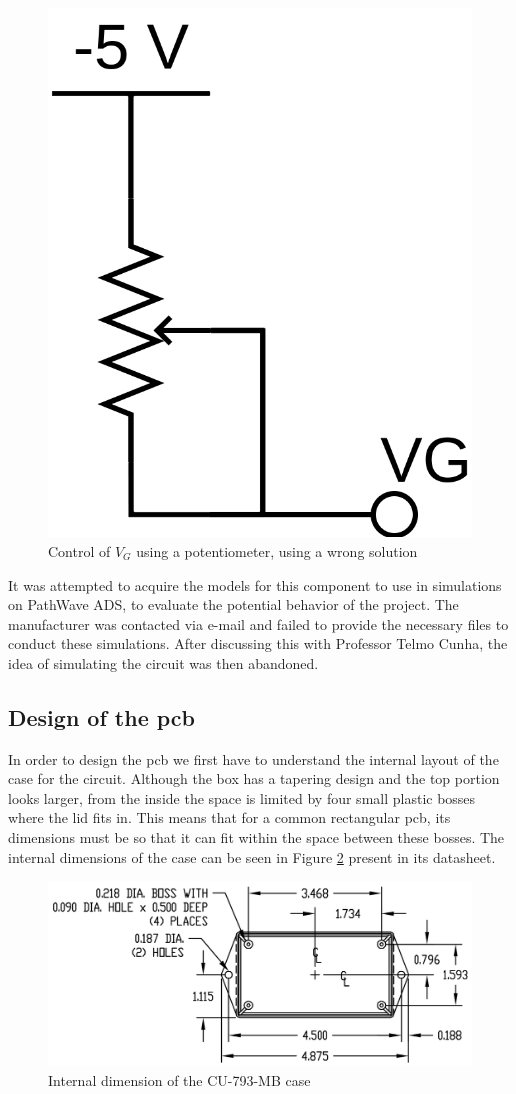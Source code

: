 \begin{figure}[H]
    \vspace*{0cm}
    \centering
    \includegraphics[width=0.15\linewidth]{figs/ch3_NPA1007potentiometerWRONG.png}
    \caption{Control of $V_{G}$ using a potentiometer, using a wrong solution}
    \label{fig:ch3_NPA1007potentiometerWRONG.png}
\end{figure}

\par It was attempted to acquire the models for this component to use in simulations on PathWave ADS, to evaluate the potential behavior of the project. The manufacturer was contacted via e-mail and failed to provide the necessary files to conduct these simulations. After discussing this with Professor Telmo Cunha, the idea of simulating the circuit was then abandoned.

\subsection{Design of the \ac{pcb}}
\par In order to design the \ac{pcb} we first have to understand the internal layout of the case for the circuit. Although the box has a tapering design and the top portion looks larger, from the inside the space is limited by four small plastic bosses where the lid fits in. This means that for a common rectangular \ac{pcb}, its dimensions must be so that it can fit within the space between these bosses. The internal dimensions of the case can be seen in Figure \ref{fig:ch3_CU-793-MBinternal.png} present in its datasheet.

\begin{figure}[H]
    \vspace*{0cm}
    \centering
    \includegraphics[width=0.7\linewidth]{figs/ch3_CU-793-MBinternal.png}
    \caption{Internal dimension of the CU-793-MB case \cite{UtiliboxCUR-793}}
    \label{fig:ch3_CU-793-MBinternal.png}
\end{figure}

